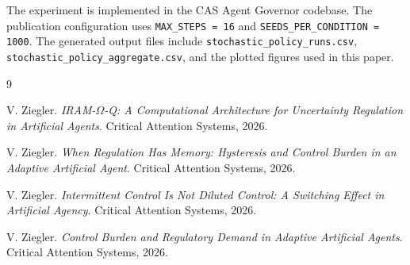 \documentclass[11pt]{article}
\begin{document}
The experiment is implemented in the CAS Agent Governor codebase. The publication configuration uses \texttt{MAX\_STEPS = 16} and \texttt{SEEDS\_PER\_CONDITION = 1000}. The generated output files include \texttt{stochastic\_policy\_runs.csv}, \texttt{stochastic\_policy\_aggregate.csv}, and the plotted figures used in this paper.

\begin{thebibliography}{9}

V. Ziegler.
\newblock \emph{IRAM-$\Omega$-Q: A Computational Architecture for Uncertainty Regulation in Artificial Agents}.
\newblock Critical Attention Systems, 2026.

V. Ziegler.
\newblock \emph{When Regulation Has Memory: Hysteresis and Control Burden in an Adaptive Artificial Agent}.
\newblock Critical Attention Systems, 2026.

V. Ziegler.
\newblock \emph{Intermittent Control Is Not Diluted Control: A Switching Effect in Artificial Agency}.
\newblock Critical Attention Systems, 2026.

V. Ziegler.
\newblock \emph{Control Burden and Regulatory Demand in Adaptive Artificial Agents}.
\newblock Critical Attention Systems, 2026.

\end{thebibliography}
\end{document}
